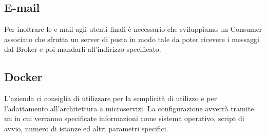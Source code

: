 		\subsection{E-mail}
		Per inoltrare le e-mail agli utenti finali è necessario che sviluppiamo un Consumer associato che sfrutta un server di posta
        in modo tale da poter ricevere i messaggi dal Broker e poi mandarli all'indirizzo specificato.
		
		\subsection{Docker}
		L'azienda ci consiglia di utilizzare  per la semplicità di utilizzo e per l'adattamento all'architettura a microservizi.
		La configurazione avverrà tramite un  in cui verranno specificate informazioni come sistema operativo, script di avvio,
        numero di istanze ed altri parametri specifici.
			